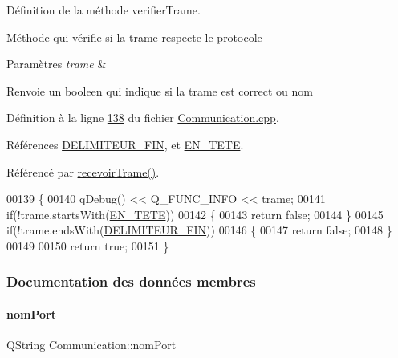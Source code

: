 Définition de la méthode verifier\+Trame. 

Méthode qui vérifie si la trame respecte le protocole 
\begin{DoxyParams}{Paramètres}
{\em trame} & \\
\hline
\end{DoxyParams}
\begin{DoxyReturn}{Renvoie}
un booleen qui indique si la trame est correct ou nom 
\end{DoxyReturn}


Définition à la ligne \hyperlink{_communication_8cpp_source_l00138}{138} du fichier \hyperlink{_communication_8cpp_source}{Communication.\+cpp}.



Références \hyperlink{_communication_8h_source_l00027}{D\+E\+L\+I\+M\+I\+T\+E\+U\+R\+\_\+\+F\+IN}, et \hyperlink{_communication_8h_source_l00025}{E\+N\+\_\+\+T\+E\+TE}.



Référencé par \hyperlink{_communication_8cpp_source_l00119}{recevoir\+Trame()}.


\begin{DoxyCode}
00139 \{
00140     qDebug() << Q\_FUNC\_INFO << trame;
00141     \textcolor{keywordflow}{if}(!trame.startsWith(\hyperlink{_communication_8h_add7c72d962d885317215f93ae8a9dc28}{EN\_TETE}))
00142     \{
00143         \textcolor{keywordflow}{return} \textcolor{keyword}{false};
00144     \}
00145     \textcolor{keywordflow}{if}(!trame.endsWith(\hyperlink{_communication_8h_aafcc0c7b4996f7783c9f4e766a233487}{DELIMITEUR\_FIN}))
00146     \{
00147         \textcolor{keywordflow}{return} \textcolor{keyword}{false};
00148     \}
00149 
00150     \textcolor{keywordflow}{return} \textcolor{keyword}{true};
00151 \}
\end{DoxyCode}


\subsubsection{Documentation des données membres}
\mbox{\label{class_communication_a5fa89ee1fc732871f3f8f177fb50bf2a}} 
\paragraph{\texorpdfstring{nom\+Port}{nomPort}}
{\footnotesize\ttfamily Q\+String Communication\+::nom\+Port\hspace{0.3cm}{\ttfamily [private]}}



